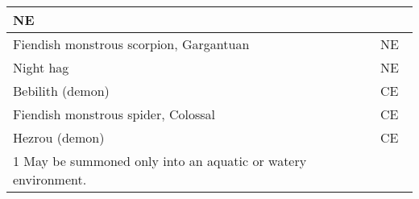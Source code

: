 \begin{longtable}{llll}
{\begin{minipage}[t]{0.601in}
NE\end{minipage}}\\
\hline
\multicolumn{1}{|p{3.326in}|}{\begin{minipage}[t]{3.326in}\raggedright
Fiendish monstrous scorpion, Gargantuan\end{minipage}} & \multicolumn{3}{p{0.601in}|}{\begin{minipage}[t]{0.601in}\raggedright
NE\end{minipage}}\\
\hline
\multicolumn{1}{|p{3.326in}|}{\begin{minipage}[t]{3.326in}\raggedright
Night hag\end{minipage}} & \multicolumn{3}{p{0.601in}|}{\begin{minipage}[t]{0.601in}\raggedright
NE\end{minipage}}\\
\hline
\multicolumn{1}{|p{3.326in}|}{\begin{minipage}[t]{3.326in}\raggedright
Bebilith (demon)\end{minipage}} & \multicolumn{3}{p{0.601in}|}{\begin{minipage}[t]{0.601in}\raggedright
CE\end{minipage}}\\
\hline
\multicolumn{1}{|p{3.326in}|}{\begin{minipage}[t]{3.326in}\raggedright
Fiendish monstrous spider, Colossal\end{minipage}} & \multicolumn{3}{p{0.601in}|}{\begin{minipage}[t]{0.601in}\raggedright
CE\end{minipage}}\\
\hline
\multicolumn{1}{|p{3.326in}|}{\begin{minipage}[t]{3.326in}\raggedright
Hezrou (demon)\end{minipage}} & \multicolumn{3}{p{0.601in}|}{\begin{minipage}[t]{0.601in}\raggedright
CE\end{minipage}}\\
\hline
\multicolumn{1}{|p{3.326in}|}{\begin{minipage}[t]{3.326in}\raggedright
1 May be summoned only into an aquatic or watery environment.\end{minipage}}\\
\hline
\end{longtable}

